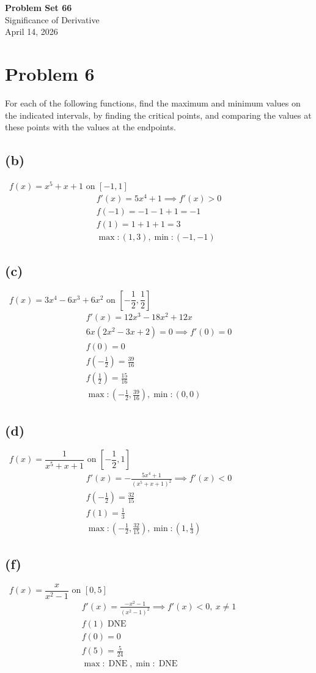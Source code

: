 \documentclass[12pt]{article}
\newcommand{\vem}{\vspace{0.5em}}
\newcommand{\problem}[1]{\section{Problem #1}}
\newcommand{\subproblem}[1]{\subsection{(#1)} \,}
\DeclareMathOperator{\dne}{DNE}
\begin{document}
\vspace*{0cm}

\begin{center}
    {\Large \bfseries Problem Set 66} \\[0.5cm]
    {\large Significance of Derivative} \\[0.35cm]
    {\normalsize April 14, 2026}
\end{center}


\problem{6}
For each of the following functions, find the maximum and minimum values on the indicated intervals, by finding the critical points, and comparing the values at these points with the values at the endpoints. \vem

\subproblem{b} $f(x)=x^5+x+1$ on $[-1,1]$
\begin{gather*}
    f'(x)=5x^4+1 \implies f'(x)>0\\
    f(-1)=-1-1+1=-1\\
    f(1)=1+1+1=3\\
    \boxed{\max:(1,3),\min :(-1,-1)}
\end{gather*}

\subproblem{c} $f(x)=3x^4-6x^3+6x^2$ on $\left[ -\dfrac{1}{2}, \dfrac{1}{2} \right]$
\begin{gather*}
    f'(x)=12x^3-18x^2+12x\\
    6x(2x^2-3x+2)=0 \implies f'(0)=0\\
    f(0)=0\\
    f(-\frac{1}{2})=\frac{39}{16}\\
    f(\frac{1}{2})=\frac{15}{16}\\
    \boxed{\max:(-\frac{1}{2},\frac{39}{16}),\min :(0, 0)}
\end{gather*}

\subproblem{d} $f(x)=\dfrac{1}{x^5+x+1}$ on $\left[ -\dfrac{1}{2}, 1 \right]$
\begin{gather*}
    f'(x)=-\frac{5x^4+1}{(x^5+x+1)^2} \implies f'(x)<0\\
    f(-\frac{1}{2})=\frac{32}{15}\\
    f(1)=\frac{1}{3}\\
    \boxed{\max:(-\frac{1}{2},\frac{32}{15}),\min :(1, \frac{1}{3})}
\end{gather*}

\subproblem{f} $f(x)=\dfrac{x}{x^2-1}$ on $[0,5]$
\begin{gather*}
    f'(x)= \frac{-x^2-1}{(x^2-1)^2} \implies f'(x)<0, \ x \ne 1\\
    f(1) \dne \\
    f(0)=0\\
    f(5)= \frac{5}{24}\\
    \boxed{\max: \dne ,\min : \dne}
\end{gather*}
\end{document}
